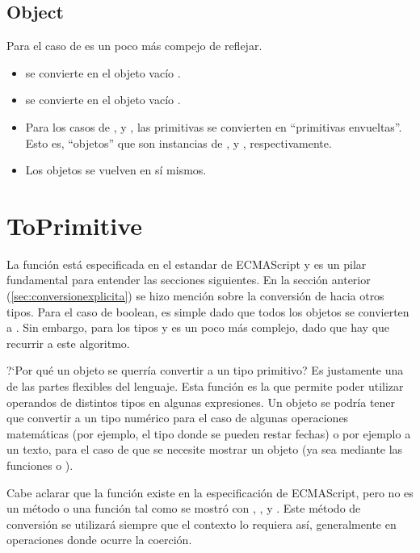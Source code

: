 \subsection{Object}

Para el caso de  es un poco más compejo de reflejar.

\begin{itemize}
\item {} se convierte en el objeto vacío \code{\{\}}.
\item {} se convierte en el objeto vacío \code{\{\}}.
\item Para los casos de ,  y , las primitivas se convierten en "`primitivas envueltas"'. Esto es, "`objetos"' que son instancias de ,  y , respectivamente.
\item Los objetos se vuelven en sí mismos.
\end{itemize}

\section{ToPrimitive}
\label{sec:toprimitive}

La función  está especificada en el estandar de ECMAScript y es un pilar fundamental para entender las secciones siguientes. En la sección anterior (\ref{sec:conversionexplicita}) se hizo mención sobre la conversión de  hacia otros tipos. Para el caso de boolean, es simple dado que todos los objetos se convierten a . Sin embargo, para los tipos  y  es un poco más complejo, dado que hay que recurrir a este algoritmo. 

?`Por qué un objeto se querría convertir a un tipo primitivo? Es justamente una de las partes flexibles del lenguaje. Esta función es la que permite poder utilizar operandos de distintos tipos en algunas expresiones. Un objeto se podría tener que convertir a un tipo numérico para el caso de algunas operaciones matemáticas (por ejemplo, el tipo  donde se pueden restar fechas) o por ejemplo a un texto, para el caso de que se necesite mostrar un objeto (ya sea mediante las funciones  o ).

Cabe aclarar que la función  existe en la especificación de ECMAScript, pero no es un método o una función tal como se mostró con , ,  y . Este método de conversión se utilizará siempre que el contexto lo requiera así, generalmente en operaciones donde ocurre la coerción.

